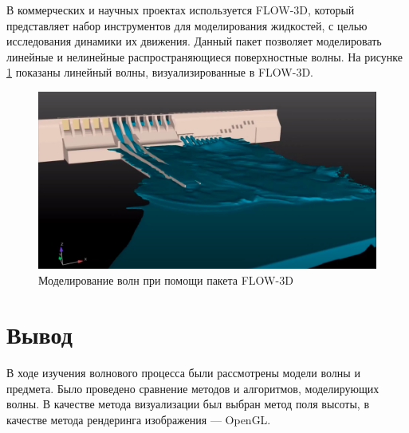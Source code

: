 В коммерческих и научных проектах используется FLOW-3D, который представляет набор инструментов для моделирования жидкостей, с целью исследования динамики их движения. Данный пакет позволяет моделировать линейные и нелинейные распространяющиеся поверхностные волны. На рисунке \ref{img:flow-3d} показаны линейный волны, визуализированные в FLOW-3D.

\begin{figure}[H]
	\begin{center}
		\includegraphics[scale=0.2]{img/flow-3d.png}
	\end{center}
	\captionsetup{justification=centering}
	\caption{Моделирование волн при помощи пакета FLOW-3D}
	\label{img:flow-3d}
\end{figure}

\section*{Вывод}

В ходе изучения волнового процесса были рассмотрены модели волны и предмета. Было проведено сравнение методов и алгоритмов, моделирующих волны. В качестве метода визуализации был выбран метод поля высоты, в качестве метода рендеринга изображения --- OpenGL.